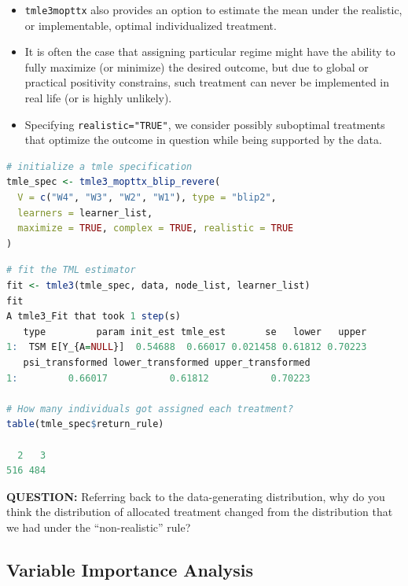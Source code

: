 \documentclass[
  12pt, krantz2,
]{book}
\newcommand{\passthrough}[1]{#1}
\theoremstyle{definition}
\theoremstyle{definition}
\theoremstyle{definition}
\newcommand{\1}{\mathbbm{1}}
\begin{document}
\begin{itemize}
\item
  \passthrough{\lstinline!tmle3mopttx!} also provides an option to estimate the mean under the
  realistic, or implementable, optimal individualized treatment.
\item
  It is often the case that assigning particular regime might have the ability to
  fully maximize (or minimize) the desired outcome, but due to
  global or practical positivity constrains, such treatment
  can never be implemented in real life (or is highly unlikely).
\item
  Specifying \passthrough{\lstinline!realistic="TRUE"!}, we consider possibly suboptimal
  treatments that optimize the outcome in question while being
  supported by the data.
\end{itemize}

\begin{lstlisting}[language=R]
# initialize a tmle specification
tmle_spec <- tmle3_mopttx_blip_revere(
  V = c("W4", "W3", "W2", "W1"), type = "blip2",
  learners = learner_list,
  maximize = TRUE, complex = TRUE, realistic = TRUE
)
\end{lstlisting}

\begin{lstlisting}[language=R]
# fit the TML estimator
fit <- tmle3(tmle_spec, data, node_list, learner_list)
fit
A tmle3_Fit that took 1 step(s)
   type         param init_est tmle_est       se   lower   upper
1:  TSM E[Y_{A=NULL}]  0.54688  0.66017 0.021458 0.61812 0.70223
   psi_transformed lower_transformed upper_transformed
1:         0.66017           0.61812           0.70223

# How many individuals got assigned each treatment?
table(tmle_spec$return_rule)

  2   3 
516 484 
\end{lstlisting}

\textbf{QUESTION:} Referring back to the data-generating distribution, why do you
think the distribution of allocated treatment changed from the distribution
that we had under the ``non-realistic'' rule?

\hypertarget{variable-importance-analysis}{%
\subsection{Variable Importance Analysis}\label{variable-importance-analysis}}
\end{document}
